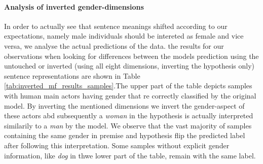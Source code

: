 \paragraph*{Analysis of inverted gender-dimensions}
In order to actually see that sentence meanings shifted according to our expectations, namely male individuals should be intereted as female and vice versa, we analyse the actual predictions of the data. the results for our observations when looking for differences between the models prediction using the untouched or inverted (using all eight dimensions, inverting the hypothesis only) sentence representations are shown in Table \ref{tab:inverted_mf_results_samples}.The upper part of the table depicts samples with human main actors having gender that re correctly classified by the original model. By inverting the mentioned dimensions we invert the gender-aspect of these actors abd subsequently a \textit{woman} in the hypothesis is actually interpreted similarily to a \textit{man} by the model. We observe that the vast majority of samples containing the same gender in premise and hypothesis flip the predicted label after following this interpretation. Some samples without explicit gender information, like \textit{dog} in thwe lower part of the table, remain with the same label. 
